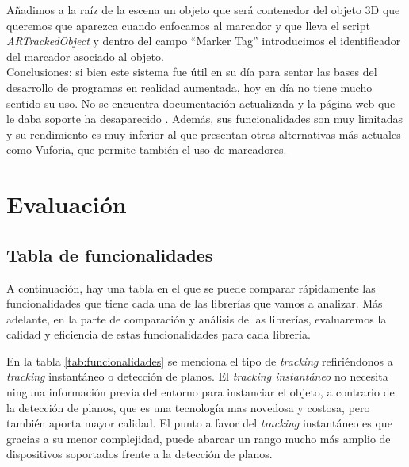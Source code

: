 Añadimos a la raíz de la escena un objeto que será contenedor del objeto 3D que queremos que aparezca cuando enfocamos al marcador y que lleva el script \textit{ARTrackedObject} y dentro del campo ``Marker Tag'' introducimos el identificador del marcador asociado al objeto.\\

Conclusiones: si bien este sistema fue útil en su día para sentar las bases del desarrollo de programas en realidad aumentada, hoy en día no tiene mucho sentido su uso. No se encuentra  documentación actualizada  y la página web que le daba soporte ha desaparecido \cite{artoolkit_web}. Además, sus funcionalidades son muy limitadas y su rendimiento es muy inferior al que presentan otras alternativas más actuales como Vuforia, que permite también el uso de marcadores.\\

\clearpage
\section{Evaluación}
\subsection{Tabla de funcionalidades}
A continuación, hay una tabla en el que se puede comparar rápidamente las funcionalidades que tiene cada una de las librerías que vamos a analizar. Más adelante, en la parte de comparación y análisis de las librerías, evaluaremos la calidad y eficiencia de estas funcionalidades para cada librería.

En la tabla \ref{tab:funcionalidades} se menciona el tipo de \textit{tracking} refiriéndonos a \textit{tracking} instantáneo o detección de planos. El \textit{tracking instantáneo} no necesita ninguna información previa del entorno para instanciar el objeto, a contrario de la detección de planos, que es una tecnología mas novedosa y costosa, pero también aporta mayor calidad. El punto a favor del \textit{tracking} instantáneo es que gracias a su menor complejidad, puede abarcar un rango mucho más amplio de dispositivos soportados frente a la detección de planos.

